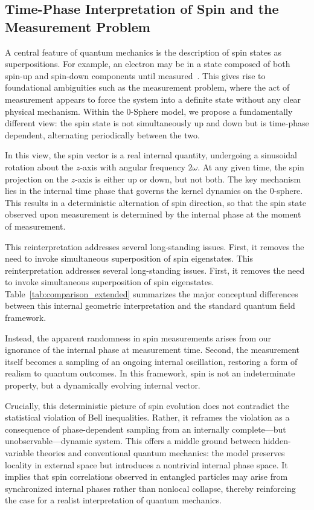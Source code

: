 \documentclass[%
 reprint,
 amsmath,amssymb,
 aps,
]{revtex4-1}
\numberwithin{equation}{section}%
\begin{document}
\subsection{Time-Phase Interpretation of Spin and the Measurement Problem}

A central feature of quantum mechanics is the description of spin states as superpositions. For example, an electron may be in a state composed of both spin-up and spin-down components until measured~\cite{uhlenbeck1925}. This gives rise to foundational ambiguities such as the measurement problem, where the act of measurement appears to force the system into a definite state without any clear physical mechanism. Within the 0-Sphere model, we propose a fundamentally different view: the spin state is not simultaneously up and down but is time-phase dependent, alternating periodically between the two.

In this view, the spin vector is a real internal quantity, undergoing a sinusoidal rotation about the \( z \)-axis with angular frequency \( 2\omega \). At any given time, the spin projection on the \( z \)-axis is either up or down, but not both. The key mechanism lies in the internal time phase that governs the kernel dynamics on the 0-sphere. This results in a deterministic alternation of spin direction, so that the spin state observed upon measurement is determined by the internal phase at the moment of measurement.

This reinterpretation addresses several long-standing issues. First, it removes the need to invoke simultaneous superposition of spin eigenstates. This reinterpretation addresses several long-standing issues. First, it removes the need to invoke simultaneous superposition of spin eigenstates. Table~\ref{tab:comparison_extended} summarizes the major conceptual differences between this internal geometric interpretation and the standard quantum field framework.

Instead, the apparent randomness in spin measurements arises from our ignorance of the internal phase at measurement time. Second, the measurement itself becomes a sampling of an ongoing internal oscillation, restoring a form of realism to quantum outcomes. In this framework, spin is not an indeterminate property, but a dynamically evolving internal vector.

Crucially, this deterministic picture of spin evolution does not contradict the statistical violation of Bell inequalities. Rather, it reframes the violation as a consequence of phase-dependent sampling from an internally complete—but unobservable—dynamic system. This offers a middle ground between hidden-variable theories and conventional quantum mechanics: the model preserves locality in external space but introduces a nontrivial internal phase space. It implies that spin correlations observed in entangled particles may arise from synchronized internal phases rather than nonlocal collapse, thereby reinforcing the case for a realist interpretation of quantum mechanics.
\end{document}
